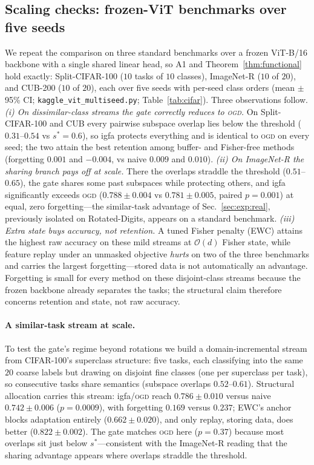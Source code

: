 \documentclass[10pt,a4paper]{article}
\theoremstyle{plain}
\theoremstyle{definition}
\newcommand{\sstar}{s^{\ast}}
\newcommand{\IGFA}{igfa}
\newcommand{\OGD}{\textsc{ogd}}
\begin{document}
\subsection{Scaling checks: frozen-ViT benchmarks over five seeds}
\label{sec:exp:cifar}
We repeat the comparison on three standard benchmarks over a frozen ViT-B/16 backbone with
a single shared linear head, so A1 and Theorem~\ref{thm:functional} hold exactly:
Split-CIFAR-100 ($10$ tasks of $10$ classes), ImageNet-R ($10$ of $20$), and CUB-200
($10$ of $20$), each over five seeds with per-seed class orders (mean $\pm$ 95\% CI;
\texttt{kaggle\_vit\_multiseed.py}; Table~\ref{tab:cifar}). Three observations follow.
\emph{(i) On dissimilar-class streams the gate correctly reduces to \OGD.} On
Split-CIFAR-100 and CUB every pairwise subspace overlap lies below the threshold
($0.31$--$0.54$ vs $\sstar=0.6$), so \IGFA{} protects everything and is identical to \OGD{}
on every seed; the two attain the best retention among buffer- and Fisher-free methods
(forgetting $0.001$ and $-0.004$, vs naive $0.009$ and $0.010$).
\emph{(ii) On ImageNet-R the sharing branch pays off at scale.} There the overlaps straddle
the threshold ($0.51$--$0.65$), the gate shares some past subspaces while protecting
others, and \IGFA{} significantly exceeds \OGD{} ($0.788\pm0.004$ vs $0.781\pm0.005$,
paired $p=0.001$) at equal, zero forgetting---the similar-task advantage of
Sec.~\ref{sec:exp:real}, previously isolated on Rotated-Digits, appears on a standard
benchmark. \emph{(iii) Extra state buys accuracy, not retention.} A tuned Fisher penalty
(EWC) attains the highest raw accuracy on these mild streams at $\mathcal O(d)$ Fisher
state, while feature replay under an unmasked objective \emph{hurts} on two of the three
benchmarks and carries the largest forgetting---stored data is not automatically an
advantage. Forgetting is small for every method on these disjoint-class streams because
the frozen backbone already separates the tasks; the structural claim therefore concerns
retention and state, not raw accuracy.

\paragraph{A similar-task stream at scale.} To test the gate's regime beyond rotations we
build a domain-incremental stream from CIFAR-100's superclass structure: five tasks, each
classifying into the same $20$ coarse labels but drawing on disjoint fine classes (one per
superclass per task), so consecutive tasks share semantics (subspace overlaps
$0.52$--$0.61$). Structural allocation carries this stream: \IGFA{}/\OGD{} reach
$0.786\pm0.010$ versus naive $0.742\pm0.006$ ($p=0.0009$), with forgetting $0.169$ versus
$0.237$; EWC's anchor blocks adaptation entirely ($0.662\pm0.020$), and only replay,
storing data, does better ($0.822\pm0.002$). The gate matches \OGD{} here ($p=0.37$)
because most overlaps sit just below $\sstar$---consistent with the ImageNet-R reading
that the sharing advantage appears where overlaps straddle the threshold.
\end{document}
